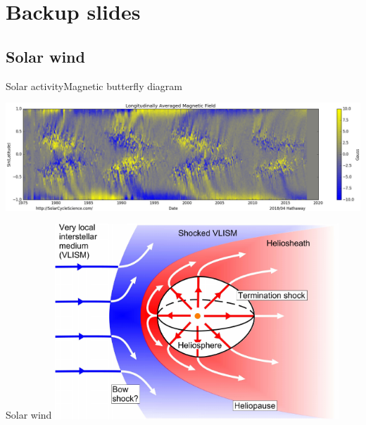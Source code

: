 \appendix


\section{Backup slides}

\subsection{Solar wind}

\begin{frame}[c,label=butterfly]{Solar activity}{Magnetic butterfly diagram}
	
	\centering
	\includegraphics[width=\textwidth]{../figures_of_others/images/Hathaway_magbfly_201804_cropped.png}
\end{frame}
\begin{frame}[plain,c]{Solar wind}{}
	\centering
	\includegraphics[width=0.8\textwidth]{../figures_of_others/images/Owens2013_Heliosphere_screenshot.png}
\end{frame}
